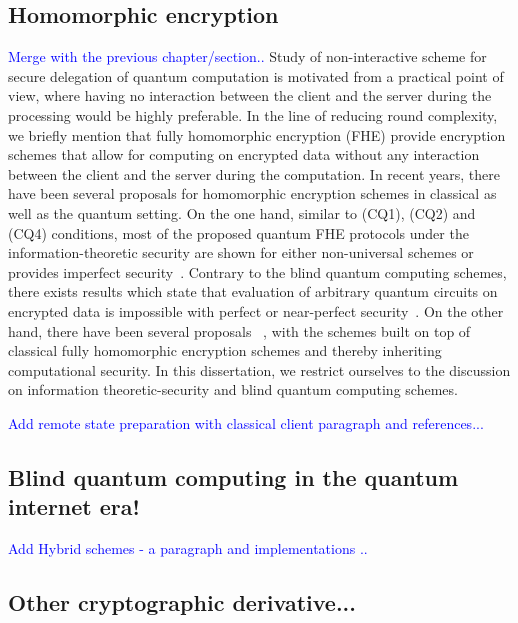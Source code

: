 
%
%

\subsection{Homomorphic encryption} 
\textcolor{blue}{Merge with the previous chapter/section..}
Study of non-interactive scheme for secure delegation of quantum computation is motivated from a practical point of view, where having no interaction between the client and the server during the processing would be highly preferable. In the line of reducing round complexity, we briefly mention that fully homomorphic encryption (FHE) provide encryption schemes that allow for computing on encrypted data without any interaction between the client and the server during the computation. In recent years, there have been several proposals for homomorphic encryption schemes in classical as well as the quantum setting. On the one hand, similar to (CQ1), (CQ2) and (CQ4) conditions, most of the proposed quantum FHE protocols under the information-theoretic security are shown for either non-universal schemes or provides imperfect security~\cite{tan2016quantum,ouyang2018quantum,lai2017statistically,tan2017practical}. Contrary to the blind quantum computing schemes, there exists results which state that evaluation of arbitrary quantum circuits on encrypted data is impossible with perfect or near-perfect security~\cite{yu2014limitations, newman2017limitations, lai2017statistically}. On the other hand, there have been several proposals ~\cite{broadbent2015quantum, dulek2016quantum, mahadev2017classical, brakerski2018quantum}, with the schemes built on top of classical fully homomorphic encryption schemes and thereby inheriting computational security. In this dissertation, we restrict ourselves to the discussion on information theoretic-security and blind quantum computing schemes. 

\textcolor{blue}{Add remote state preparation with classical client paragraph and references...}

\subsection{Blind quantum computing in the quantum internet era!} 
\textcolor{blue}{Add Hybrid schemes - a paragraph and implementations ..}


\subsection{Other cryptographic derivative...}
